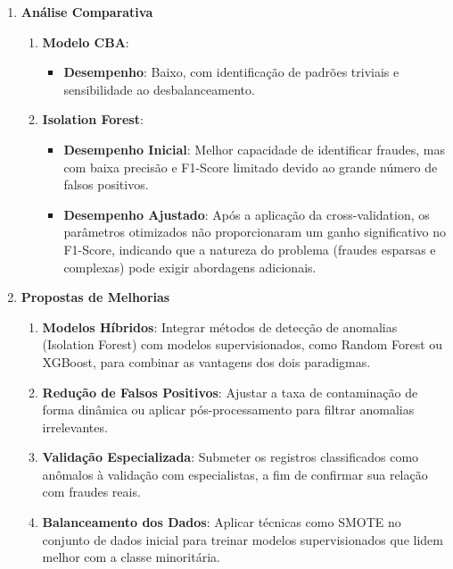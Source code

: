 \documentclass[12pt,a4paper]{article}
\begin{document}
\begin{enumerate}
    \textbf{Interpreta\c{c}\~{a}o:} Apesar do ajuste fino dos hiperpar\^ametros, o F1-Score final apresentou uma leve redu\c{c}\~{a}o em compara\c{c}\~{a}o ao processamento inicial (0.0408 para 0.0337). Esse comportamento pode ser atribuído \`a tentativa de ajustar a taxa de contamina\c{c}\~{a}o para reduzir falsos positivos, o que afetou o equil\'ibrio entre precis\~{a}o e recall.

    \item \textbf{An\'alise Comparativa}
    \begin{enumerate}
        \item \textbf{Modelo CBA}:
        \begin{itemize}
            \item \textbf{Desempenho}: Baixo, com identifica\c{c}\~{a}o de padr\~{o}es triviais e sensibilidade ao desbalanceamento.
        \end{itemize}
        \item \textbf{Isolation Forest}:
        \begin{itemize}
            \item \textbf{Desempenho Inicial}: Melhor capacidade de identificar fraudes, mas com baixa precis\~{a}o e F1-Score limitado devido ao grande n\'umero de falsos positivos.
            \item \textbf{Desempenho Ajustado}: Ap\'os a aplica\c{c}\~{a}o da cross-validation, os par\^ametros otimizados n\~{a}o proporcionaram um ganho significativo no F1-Score, indicando que a natureza do problema (fraudes esparsas e complexas) pode exigir abordagens adicionais.
        \end{itemize}
    \end{enumerate}

    \item \textbf{Propostas de Melhorias}
    \begin{enumerate}
        \item \textbf{Modelos H\'ibridos}: Integrar m\'etodos de detec\c{c}\~{a}o de anomalias (Isolation Forest) com modelos supervisionados, como Random Forest ou XGBoost, para combinar as vantagens dos dois paradigmas.
        \item \textbf{Redu\c{c}\~{a}o de Falsos Positivos}: Ajustar a taxa de contamina\c{c}\~{a}o de forma din\^amica ou aplicar p\'os-processamento para filtrar anomalias irrelevantes.
        \item \textbf{Valida\c{c}\~{a}o Especializada}: Submeter os registros classificados como an\^omalos \`a valida\c{c}\~{a}o com especialistas, a fim de confirmar sua rela\c{c}\~{a}o com fraudes reais.
        \item \textbf{Balanceamento dos Dados}: Aplicar t\'ecnicas como SMOTE no conjunto de dados inicial para treinar modelos supervisionados que lidem melhor com a classe minorit\'aria.
    \end{enumerate}
\end{enumerate}
\end{document}
